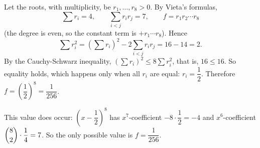 Let the roots, with multiplicity, be $r_1,\dots,r_8>0$. By Vieta's formulas,
\[\sum r_i=4,\qquad\sum_{i<j}r_ir_j=7,\qquad f=r_1r_2\cdots r_8\]
(the degree is even, so the constant term is $+r_1\cdots r_8$). Hence
\[\sum r_i^2=\left(\sum r_i\right)^2-2\sum_{i<j}r_ir_j=16-14=2.\]
By the Cauchy-Schwarz inequality, $\left(\sum r_i\right)^2\le8\sum r_i^2$, that is, $16\le16$. So equality holds, which happens only when all $r_i$ are equal: $r_i=\dfrac12$. Therefore $f=\left(\dfrac12\right)^8=\dfrac1{256}$.

This value does occur: $\left(x-\dfrac12\right)^8$ has $x^7$-coefficient $-8\cdot\dfrac12=-4$ and $x^6$-coefficient $\dbinom82\cdot\dfrac14=7$. So the only possible value is $\boxed{f=\dfrac{1}{256}}$.
